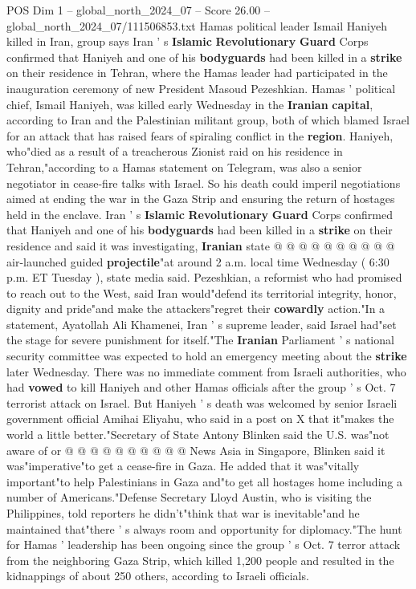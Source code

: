 \begin{textsample}{POS Dim 1 – global\_north\_2024\_07 – Score 26.00 – global\_north\_2024\_07/111506853.txt}  \label{ex:f1_pos_183}
Hamas political leader Ismail Haniyeh killed in Iran, group says Iran ' s \textbf{Islamic} \textbf{Revolutionary} \textbf{Guard} Corps confirmed that Haniyeh and one of his \textbf{bodyguards} had been killed in a \textbf{strike} on their residence in Tehran, where the Hamas leader had participated in the inauguration ceremony of new President Masoud Pezeshkian.
Hamas ' political chief, Ismail Haniyeh, was killed early Wednesday in the \textbf{Iranian} \textbf{capital}, according to Iran and the Palestinian militant group, both of which blamed Israel for an attack that has raised fears of spiraling conflict in the \textbf{region}.
Haniyeh, who"died as a result of a treacherous Zionist raid on his residence in Tehran,"according to a Hamas statement on Telegram, was also a senior negotiator in cease-fire talks with Israel.
So his death could imperil negotiations aimed at ending the war in the Gaza Strip and ensuring the return of hostages held in the enclave.
Iran ' s \textbf{Islamic} \textbf{Revolutionary} \textbf{Guard} Corps confirmed that Haniyeh and one of his \textbf{bodyguards} had been killed in a \textbf{strike} on their residence and said it was investigating, \textbf{Iranian} state @ @ @ @ @ @ @ @ @ @ air-launched guided \textbf{projectile}"at around 2 a.m. local time Wednesday ( 6:30 p.m.
ET Tuesday ), state media said.
Pezeshkian, a reformist who had promised to reach out to the West, said Iran would"defend its territorial integrity, honor, dignity and pride"and make the attackers"regret their \textbf{cowardly} action."In a statement, Ayatollah Ali Khamenei, Iran ' s supreme leader, said Israel had"set the stage for severe punishment for itself."The \textbf{Iranian} Parliament ' s national security committee was expected to hold an emergency meeting about the \textbf{strike} later Wednesday.
There was no immediate comment from Israeli authorities, who had \textbf{vowed} to kill Haniyeh and other Hamas officials after the group ' s Oct. 7 terrorist attack on Israel.
But Haniyeh ' s death was welcomed by senior Israeli government official Amihai Eliyahu, who said in a post on X that it"makes the world a little better."Secretary of State Antony Blinken said the U.S. was"not aware of or @ @ @ @ @ @ @ @ @ @ News Asia in Singapore, Blinken said it was"imperative"to get a cease-fire in Gaza.
He added that it was"vitally important"to help Palestinians in Gaza and"to get all hostages home including a number of Americans."Defense Secretary Lloyd Austin, who is visiting the Philippines, told reporters he didn't"think that war is inevitable"and he maintained that"there ' s always room and opportunity for diplomacy."The hunt for Hamas ' leadership has been ongoing since the group ' s Oct. 7 terror attack from the neighboring Gaza Strip, which killed 1,200 people and resulted in the kidnappings of about 250 others, according to Israeli officials.

\end{textsample}
